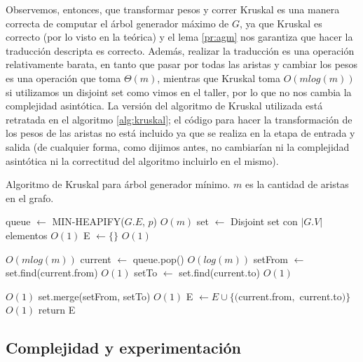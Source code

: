 \documentclass{article}
\theoremstyle{definition}
\theoremstyle{remark}
\begin{document}
Observemos, entonces, que transformar pesos y correr Kruskal es una manera correcta de computar el árbol generador máximo de $G$, ya que Kruskal es correcto (por lo visto en la teórica) y el lema \ref{pr:agm} nos garantiza que hacer la traducción descripta es correcto. Además, realizar la traducción es una operación relativamente barata, en tanto que pasar por todas las aristas y cambiar los pesos es una operación que toma $\Theta(m)$, mientras que Kruskal toma $O(m log(m))$ si utilizamos un disjoint set como vimos en el taller, por lo que no nos cambia la complejidad asintótica. La versión del algoritmo de Kruskal utilizada está retratada en el algoritmo \ref{alg:kruskal}; el código para hacer la transformación de los pesos de las aristas no está incluido ya que se realiza en la etapa de entrada y salida (de cualquier forma, como dijimos antes, no cambiarían ni la complejidad asintótica ni la correctitud del algoritmo incluirlo en el mismo).

\begin{algorithm}[h!]
\caption{Algoritmo de Kruskal para árbol generador mínimo. $m$ es la cantidad de aristas en el grafo. \label{alg:kruskal}}

\begin{algorithmic}[h!]
\State queue $\gets$ MIN-HEAPIFY($G.E$, $p$) \Comment $O(m)$
\State set $\gets$ Disjoint set con $|G.V|$ elementos \Comment $O(1)$
\State E $\gets \{\}$ \Comment $O(1)$

 \Comment $O(m log(m))$
\State current $\gets$ queue.pop() \Comment $O(log(m))$
\State setFrom $\gets$ set.find(current.from) \Comment $O(1)$
\State setTo $\gets$ set.find(current.to) \Comment $O(1)$

 \Comment $O(1)$
\State set.merge(setFrom, setTo) \Comment $O(1)$
\State E $\gets E \cup \{($current.from$,$ current.to$)\}$ \Comment $O(1)$
\EndIf
\EndWhile
\State return E
\EndProcedure
\end{algorithmic}
\end{algorithm}

\subsection{Complejidad y experimentación}
\end{document}
